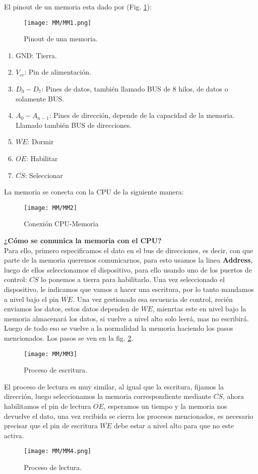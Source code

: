 \documentclass[
	12pt, %
	fleqn, %
	a4paper, %
	oneside, %
]{LegrandOrangeBook}
\begin{document}
El pinout de un memoria esta dado por (Fig. \ref{fig:mem pinout}):
\begin{figure}[H]
\centering
\texttt{[image: MM/MM1.png]}
\caption{Pinout de una memoria.}
\label{fig:mem pinout}
\end{figure}
\begin{enumerate}
\item GND: Tierra.
\item $V_{cc}$: Pin de alimentación.
\item $D_0-D_7$: Pines de datos, también llamado BUS de 8 hilos, de datos o solamente BUS.
\item $A_0-A_{n-1}$: Pines de dirección, depende de la capacidad de la memoria. Llamado también BUS de direcciones.
\item $\overline{WE}$: Dormir
\item $\overline{OE}$: Habilitar
\item $\overline{CS}$: Seleccionar
\end{enumerate}
La memoria se conecta con la CPU de la siguiente manera:\\
\begin{figure}[H]
\centering
\texttt{[image: MM/MM2]}
\caption{Conexión CPU-Memoria}
\end{figure}
\textbf{¿Cómo se comunica la memoria con el CPU?}\\
Para ello, primero especificamos el dato en el bus de direcciones, es decir, con que parte de la memoria queremos comunicarnos, para esto usamos la linea \textbf{Address}, luego de ellos seleccionamos el dispositivo, para ello usando uno de los puertos de control: $\overline{CS}$ lo ponemos a tierra para habilitarlo. Una vez seleccionado el dispositivo, le indicamos que vamos a hacer una escritura, por lo tanto mandamos a nivel bajo el pin $\overline{WE}$. Una vez gestionado esa secuencia de control, recién enviamos los datos, estos datos dependen de $\overline{WE}$, mienrtas este en nivel bajo la memoria almacenará los datos, si vuelve a nivel alto solo leerá, mas no escribirá. Luego de todo eso se vuelve a la normalidad la memoria haciendo los pasos mencionados. Los pasos se ven en la fig. \ref{fig: escritura memoria}.\\
\begin{figure}[H]
\centering
\texttt{[image: MM/MM3]}
\caption{Proceso de escritura.}
\label{fig: escritura memoria}
\end{figure}
El proceso de lectura es muy similar, al igual que la escritura, fijamos la dirección, luego seleccionamos la memoria correspondiente mediante $\overline{CS}$, ahora habilitamos el pin de lectura $\overline{OE}$, esperamos un tiempo y la memoria nos devuelve el dato, una vez recibida se cierra los procesos mencionados, es necesario precisar que el pin de escritura $\overline{WE}$ debe estar a nivel alto para que no este activa.
\begin{figure}[H]
\centering
\texttt{[image: MM/MM4.png]}
\caption{Proceso de lectura.}
\end{figure}
\end{document}
